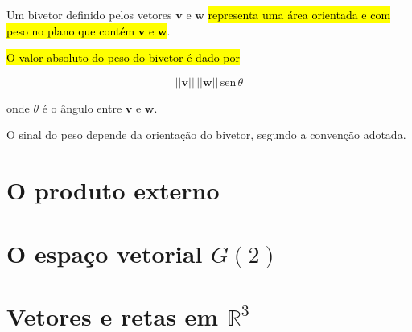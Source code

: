\documentclass[
  letterpaper,
  DIV=11,
  numbers=noendperiod]{scrreprt}
\begin{document}
\begin{itemize}
  \begin{tcolorbox}[standard jigsaw,bottomtitle=1mm, opacityback=0, title=\textcolor{quarto-callout-note-color}{\faInfo}\hspace{0.5em}{Resumindo: bivetores \(=\) áreas orientadas e com peso}, colframe=quarto-callout-note-color-frame, opacitybacktitle=0.6, left=2mm, coltitle=black, rightrule=.15mm, titlerule=0mm, colback=white, colbacktitle=quarto-callout-note-color!10!white, arc=.35mm, bottomrule=.15mm, toprule=.15mm, leftrule=.75mm, toptitle=1mm]
  Um bivetor definido pelos vetores $\mathbf{v}$ e $\mathbf{w}$
  {\hl{representa uma área orientada e com peso no plano que contém
  $\mathbf{v}$ e $\mathbf{w}$}}.

  {\hl{O valor absoluto do peso do bivetor é dado por}}

  \[
  ||\mathbf{v}||\, ||\mathbf{w}|| \,\text{sen}\,\theta
  \]

  onde $\theta$ é o ângulo entre $\mathbf{v}$ e $\mathbf{w}$.

  O sinal do peso depende da orientação do bivetor, segundo a convenção
  adotada.
  \end{tcolorbox}
\end{itemize}

\hypertarget{o-produto-externo}{%
\section{O produto externo}\label{o-produto-externo}}

\hypertarget{o-espauxe7o-vetorial-g2}{%
\section{\texorpdfstring{O espaço vetorial
$G(2)$}{O espaço vetorial }}\label{o-espauxe7o-vetorial-g2}}

\hypertarget{vetores-e-retas-em-mathbbr3}{%
\section{\texorpdfstring{Vetores e retas em
$\mathbb{R}^3$}{Vetores e retas em }}\label{vetores-e-retas-em-mathbbr3}}
\end{document}
